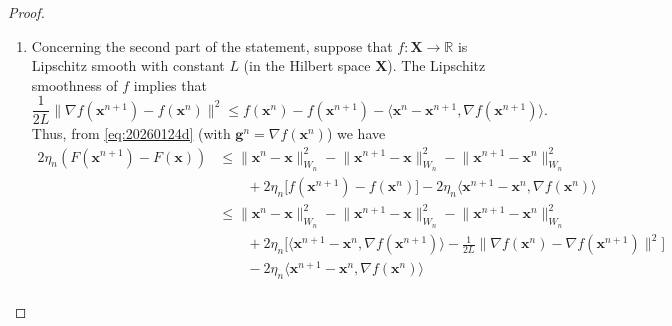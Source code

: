 \documentclass[11pt]{article}
\theoremstyle{plain}
\theoremstyle{definition}
\theoremstyle{remark}
\newcommand{\norm}[1]{\lVert{#1}\rVert}
\newcommand{\pair}[2]{{\langle{{#1},{#2}}\rangle}}
\newcommand{\HH}{X}
\newcommand{\bHH}{\bm{X}}
\newcommand{\R}{\mathbb{R}}
\newcommand{\x}{x}
\newcommand{\bx}{\bm{x}}
\newcommand{\buu}{\bm{g}}
\newcommand{\uu}{g}
\newcommand{\iter}{n}
\newcommand{\W}{W}
\begin{document}
\begin{proof}
\begin{enumerate}[label={\rm (\roman*)}]
\begin{align*}
& =2 \bigg(\pair{\bx^\iter-\bx^{\iter+1}}{\eta_\iter\W_{\iter}^{-1}(\buu^\iter - \buu^{\iter+1})}_{\W_\iter} 
-\frac{\norm{\bx^\iter-\bx^{\iter+1}}_{\W_\iter}^2}{2}\bigg)\\
&\leq 2 \frac{\norm{\eta_\iter\W_\iter^{-1}(\buu^\iter -\buu^{\iter+1})}_{\W_\iter}^2}{2} = \eta_\iter^2\norm{\buu^\iter- \buu^{\iter+1}}_{\W_\iter^{-1}}^2
\end{align*}
and \eqref{lemma1_bound} follows.
\item\label{lem:basicPGstep_ii} 
Concerning the second part of the statement, suppose that $f:\bHH\to \R$ is Lipschitz smooth with constant $L$ (in the Hilbert space $\bHH$). 
The Lipschitz smoothness of $f$ implies that
\begin{equation*}
\frac{1}{2L}\norm{\nabla f(\bx^{\iter+1})-f(\bx^\iter)}^2\leq f(\bx^\iter)-f(\bx^{\iter+1})- \pair{\bx^\iter-\bx^{\iter+1}}{\nabla f(\bx^{\iter+1})}. 
\end{equation*}
Thus, from \eqref{eq:20260124d} (with $\buu^\iter= \nabla f(\bx^\iter)$) we have
\begin{align*}
2\eta_\iter (F(\bx^{\iter+1})- F(\bx)) &\leq \norm{\bx^\iter-\bx}_{\W_\iter}^2 - \norm{\bx^{\iter+1}-\bx}_{\W_\iter}^2 - \norm{\bx^{\iter+1}-\bx^{\iter}}_{\W_\iter}^2\\[1ex]
&\qquad +2\eta_\iter \big[f(\bx^{\iter+1})-f(\bx^{\iter})\big] - 2\eta_\iter\pair{\bx^{\iter+1}-\bx^{\iter}}{\nabla f(\bx^{\iter})}\\[1ex]
&\leq\norm{\bx^{\iter}-\bx}_{\W_\iter}^2 - \norm{\bx^{\iter+1}-\bx}_{\W_\iter}^2 - \norm{\bx^{\iter+1}-\bx^{\iter}}_{\W_\iter}^2\\
&\qquad +2\eta_\iter \Big[\pair{\bx^{\iter+1}-\bx^{\iter}}{\nabla f(\bx^{\iter+1})}- \frac{1}{2L} \norm{\nabla f(\bx^{\iter})-\nabla f(\bx^{\iter+1})}^2\Big] \\
&\qquad- 2\eta_\iter\pair{\bx^{\iter+1}-\bx^{\iter}}{\nabla f(\bx^{\iter})}\\[1ex]

\end{align*}
\end{enumerate}
\end{proof}
\end{document}
